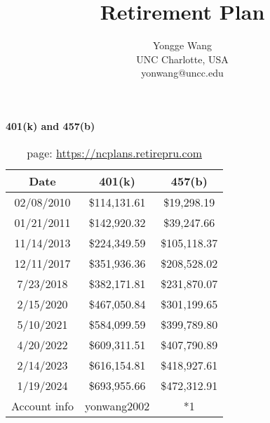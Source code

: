 \documentclass[11pt]{article}
\begin{document}
\title{Retirement Plan}
\author{Yongge Wang\\
UNC Charlotte, USA\\
yonwang@uncc.edu}
\author{}
\date{}


\noindent
{\bf 401(k) and 457(b)}
\begin{table}[htp]
\begin{center}
\begin{tabular}{|c|c|c|} \hline
{\bf Date} & {\bf 401(k)} & {\bf 457(b)}\\ \hline
02/08/2010 & \$114,131.61 & \$19,298.19\\ \hline
01/21/2011 & \$142,920.32 & \$39,247.66\\ \hline
11/14/2013 & \$224,349.59 & \$105,118.37\\ \hline
12/11/2017 & \$351,936.36& \$208,528.02\\ \hline
7/23/2018 & \$382,171.81& \$231,870.07\\ \hline
2/15/2020 & \$467,050.84 & \$301,199.65\\ \hline
5/10/2021 & \$584,099.59 & \$399,789.80\\ \hline
4/20/2022 & \$609,311.51& \$407,790.89\\ \hline
2/14/2023 & \$616,154.81 & \$418,927.61 \\ \hline
1/19/2024 & \$693,955.66& \$472,312.91 \\ \hline
Account info & yonwang2002 & *1 \\ \hline
\end{tabular}
\caption{page: \url{https://ncplans.retirepru.com}}
\label{401k}
\end{center}
\end{table}
\end{document}
